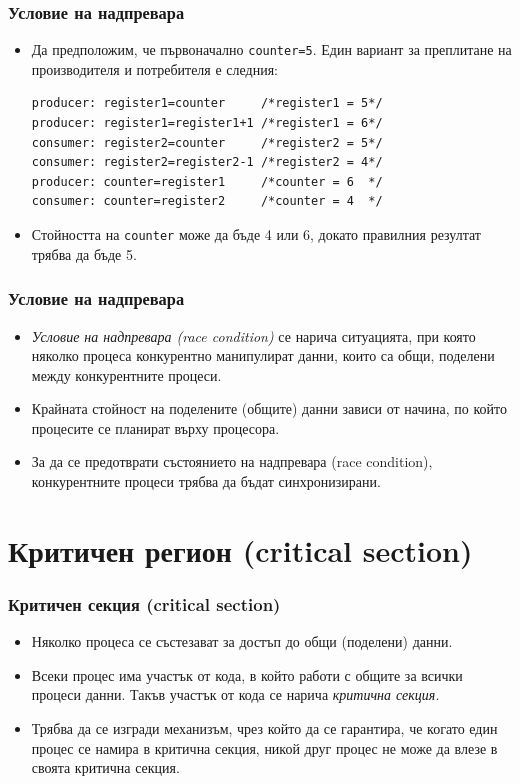 \documentclass[ignorenonframetext, hyperref=unicode]{beamer}
\begin{document}
\begin{frame}[containsverbatim]
\frametitle{Условие на надпревара}
\begin{itemize}
  \item Да предположим, че първоначално \lstinline{counter=5}. Един вариант за
  преплитане на производителя и потребителя е следния:
\begin{lstlisting}
producer: register1=counter     /*register1 = 5*/
producer: register1=register1+1 /*register1 = 6*/
consumer: register2=counter     /*register2 = 5*/
consumer: register2=register2-1 /*register2 = 4*/
producer: counter=register1     /*counter = 6  */
consumer: counter=register2     /*counter = 4  */
\end{lstlisting}
  \item Стойността на \lstinline{counter} може да бъде 4 или 6, докато правилния
  резултат трябва да бъде 5.
\end{itemize}
\end{frame}

\begin{frame}[containsverbatim]
\frametitle{Условие на надпревара}
\begin{itemize}
  \item {\em Условие на надпревара (race condition)} се нарича ситуацията, при която
  няколко
  процеса конкурентно манипулират данни, които са общи, поделени между конкурентните
  процеси.
  \item Крайната стойност на поделените (общите) данни зависи от начина, по
  който процесите се планират върху процесора.
  \item За да се предотврати състоянието на надпревара (race condition),
  конкурентните процеси трябва да бъдат синхронизирани.
\end{itemize}
\end{frame}

\section{Критичен регион (critical section)}

\begin{frame}[containsverbatim]
\frametitle{Критичен секция (critical section)}
\begin{itemize}
  \item Няколко процеса се състезават за достъп до общи (поделени) данни.
  \item Всеки процес има участък от кода, в който работи с общите за всички процеси
  данни. Такъв участък от кода се нарича {\em критична секция}.
  \item Трябва да се изгради механизъм, чрез който да се гарантира, че когато
  един процес се намира в критична секция, никой друг процес не може да
  влезе в своята критична секция.
\end{itemize}
\end{frame}
\end{document}
